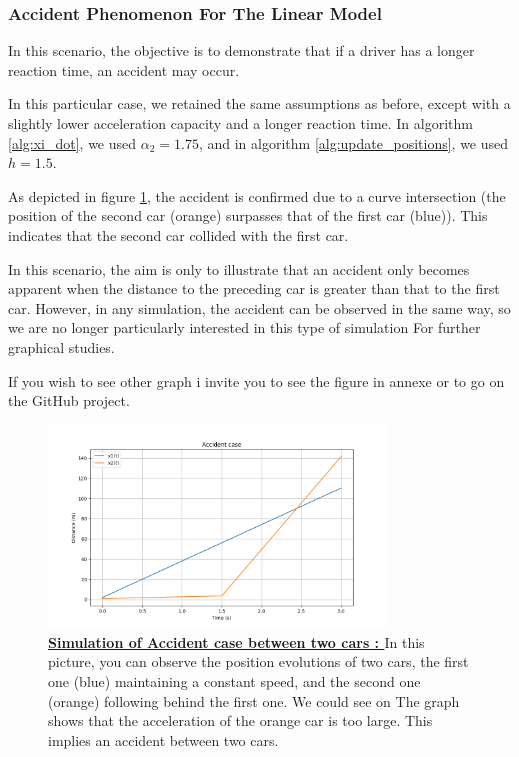 \documentclass{article}
\begin{document}
		
		\subsubsection{Accident Phenomenon For The Linear Model }
		
		In this scenario, the objective is to demonstrate that if a driver has a longer reaction time, an accident may occur.
		
		In this particular case, we retained the same assumptions as before, except with a slightly lower acceleration capacity and a longer reaction time. In algorithm \ref{alg:xi_dot}, we used $\alpha_2=1.75$, and in algorithm \ref{alg:update_positions}, we used $h=1.5$.
		
		As depicted in figure \ref{fig:Acc1}, the accident is confirmed due to a curve intersection (the position of the second car (orange) surpasses that of the first car (blue)). This indicates that the second car collided with the first car.
		
		In this scenario, the aim is only to illustrate that an accident only becomes apparent when the distance to the preceding car is greater than that to the first car. However, in any simulation, the accident can be observed in the same way, so we are no longer particularly interested in this type of simulation For further graphical studies.
		
		If you wish to see other graph i invite you to see the figure in annexe or to go on the GitHub project.
	
		
		\begin{figure}[H]
			\centering
			\includegraphics[width=0.8\textwidth]{Acc1.png}
			\caption[Simulation of Accident case between two cars]{\textbf{\underline{Simulation of Accident case between two cars : }} In this picture, you can observe the position evolutions of two cars, the first one (blue) maintaining a constant speed, and the second one (orange) following behind the first one. We could see on The graph shows that the acceleration of the orange car is too large. This implies an accident between two cars.}
			\label{fig:Acc1}
		\end{figure}
		
\end{document}
